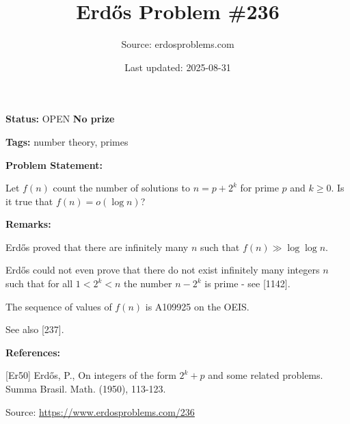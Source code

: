 \documentclass{article}
\title{Erd\H{o}s Problem \#236}
\date{Last updated: 2025-08-31}
\author{Source: erdosproblems.com}
\begin{document}
\maketitle

\noindent\textbf{Status:} OPEN \quad \textbf{No prize}

\noindent\textbf{Tags:} number theory, primes

\medskip
\noindent\textbf{Problem Statement:}

Let $f(n)$ count the number of solutions to $n=p+2^k$ for prime $p$ and $k\geq 0$. Is it true that $f(n)=o(\log n)$?

\bigskip
\noindent\textbf{Remarks:}

Erd\H{o}s \cite{Er50} proved that there are infinitely many $n$ such that $f(n)\gg \log\log n$.

Erd\H{o}s could not even prove that there do not exist infinitely many integers $n$ such that for all $1< 2^k<n$ the number $n-2^k$ is prime - see [1142].

The sequence of values of $f(n)$ is A109925 on the OEIS.

See also [237].

\bigskip
\noindent\textbf{References:}

[Er50] Erd\H{o}s, P., On integers of the form $2^k+p$ and some related problems. Summa Brasil. Math. (1950), 113-123.

\bigskip
\noindent\small{Source: \url{https://www.erdosproblems.com/236}}
\end{document}
